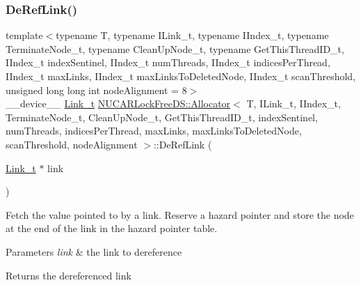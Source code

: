 \subsubsection{\texorpdfstring{De\+Ref\+Link()}{DeRefLink()}}
{\footnotesize\ttfamily template$<$typename T, typename I\+Link\+\_\+t, typename I\+Index\+\_\+t, typename Terminate\+Node\+\_\+t, typename Clean\+Up\+Node\+\_\+t, typename Get\+This\+Thread\+I\+D\+\_\+t, I\+Index\+\_\+t index\+Sentinel, I\+Index\+\_\+t num\+Threads, I\+Index\+\_\+t indices\+Per\+Thread, I\+Index\+\_\+t max\+Links, I\+Index\+\_\+t max\+Links\+To\+Deleted\+Node, I\+Index\+\_\+t scan\+Threshold, unsigned long long int node\+Alignment = 8$>$ \\
\+\_\+\+\_\+device\+\_\+\+\_\+ \mbox{\hyperlink{class_n_u_c_a_r_lock_free_d_s_1_1_allocator_a5508d82b795e6c1977bebb67b5e5b686}{Link\+\_\+t}} \mbox{\hyperlink{class_n_u_c_a_r_lock_free_d_s_1_1_allocator}{N\+U\+C\+A\+R\+Lock\+Free\+D\+S\+::\+Allocator}}$<$ T, I\+Link\+\_\+t, I\+Index\+\_\+t, Terminate\+Node\+\_\+t, Clean\+Up\+Node\+\_\+t, Get\+This\+Thread\+I\+D\+\_\+t, index\+Sentinel, num\+Threads, indices\+Per\+Thread, max\+Links, max\+Links\+To\+Deleted\+Node, scan\+Threshold, node\+Alignment $>$\+::De\+Ref\+Link (\begin{DoxyParamCaption}\item[{\mbox{\hyperlink{class_n_u_c_a_r_lock_free_d_s_1_1_allocator_a5508d82b795e6c1977bebb67b5e5b686}{Link\+\_\+t}} $\ast$}]{link }\end{DoxyParamCaption})\hspace{0.3cm}{\ttfamily [inline]}}

Fetch the value pointed to by a link. Reserve a hazard pointer and store the node at the end of the link in the hazard pointer table. 
\begin{DoxyParams}{Parameters}
{\em link} & the link to dereference \\
\hline
\end{DoxyParams}
\begin{DoxyReturn}{Returns}
the dereferenced link 
\end{DoxyReturn}
\mbox{\label{class_n_u_c_a_r_lock_free_d_s_1_1_allocator_a3bf029c737539d9bfa9c9296ac17d83b}} 
